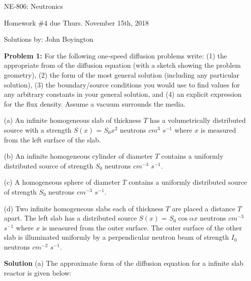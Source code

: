 \documentclass{amsart}
\theoremstyle{definition}
\begin{document}
\LARGE{NE-806: Neutronics}
 
\large
Homework \#4 due Thurs. November 15th, 2018
 
Solutions by: John Boyington
\newline
\bigskip



\textbf{Problem 1:} \newline For the following one-speed diffusion problems write: (1) the appropriate from of the diffusion equation (with a sketch showing the problem geometry), (2) the form of the most general solution (including any particular solution), (3) the boundary/source conditions you would use to find values for any arbitrary constants in your general solution, and (4) an explicit expression for the flux density.
Assume a vacuum surrounds the media.
\bigbreak

(a) An infinite homogeneous slab of thickness $T$ has a volumetrically distributed source with a strength $S(x)$ = $S_0x^2$ neutrons $cm^3$ $s^{-1}$ where $x$ is measured from the left surface of the slab.\newline
\bigbreak

(b) An infinite homogeneous cylinder of diameter $T$ contains a uniformly distributed source of strength $S_0$ neutrons $cm^{-3}$ $s^{-1}$.\newline
\bigbreak

(c) A homogeneous sphere of diameter $T$ contains a uniformly distributed source of strength $S_0$ neutrons $cm^{-3}$ $s^{-1}$.\newline
\bigbreak

(d) Two infinite homogeneous slabs each of thickness $T$ are placed a distance $T$ apart.
The left slab has a distributed source $S(x)$ = $S_0\cos \alpha x$ neutrons $cm^{-3}$ $s^{-1}$ where $x$ is measured from the outer surface.
The outer surface of the other slab is illuminated uniformly by a perpendicular neutron beam of strength $I_0$ neutrons $cm^{-2}$ $s^{-1}$.\newline
\bigbreak

\textbf{Solution}
\bigbreak
(a) The approximate form of the diffusion equation for a infinite slab reactor is given below:
\bigbreak
\end{document}
